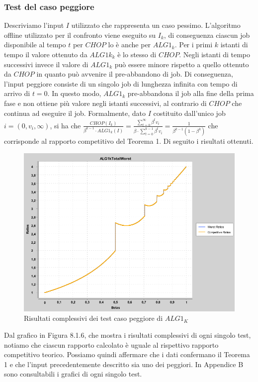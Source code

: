 \documentclass[12pt]{article}
\begin{document}
\subsubsection{Test del caso peggiore}
Descriviamo l'input $I$ utilizzato che rappresenta un caso pessimo. L'algoritmo offline utilizzato per il confronto viene eseguito su $I_{k}$, di conseguenza ciascun job disponibile al tempo $t$ per $CHOP$ lo è anche per $ALG1_{k}$. Per i primi $k$ istanti di tempo il valore ottenuto da $ALG1k_{k}$ è lo stesso di $CHOP$. Negli istanti di tempo successivi invece il valore di $ALG1_{k}$ può essere minore rispetto a quello ottenuto da $CHOP$ in quanto può avvenire il pre-abbandono di job. Di conseguenza, l'input peggiore consiste di un singolo job di lunghezza infinita con tempo di arrivo di $t = 0$. In questo modo, $ALG1_{k}$ pre-abbandona il job alla fine della prima fase e non ottiene più valore negli istanti successivi, al contrario di $CHOP$ che continua ad eseguire il job. Formalmente, dato $I$ costituito dall'unico job  $i = (0, v_{i},\infty)$, si ha che $\frac{CHOP(I_{k})}{\beta^{k-1} \cdot ALG1_{k}(I)} = \frac{\sum_{t = 0}^{\infty}\beta^{t}v_{i}}{\beta \cdot \sum_{t = 0}^{k-1}\beta^{t} v_{i}} = \frac{1}{\beta^{k-1}(1 - \beta^{k})}$ che corrisponde al rapporto competitivo del Teorema 1. Di seguito i risultati ottenuti.
\begin{figure}[H]
\caption{Risultati complessivi dei test caso peggiore di $ALG1_{K}$}
\centering
\includegraphics[scale=0.4]{worst/ALG1kTotalWorst.png}
\end{figure}
Dal grafico in Figura 8.1.6, che mostra i risultati complessivi di ogni singolo test, notiamo che ciascun rapporto calcolato è uguale al rispettivo rapporto competitivo teorico. Possiamo quindi affermare che i dati confermano il Teorema 1 e che l'input precedentemente descritto sia uno dei peggiori. In Appendice B sono consultabili i grafici di ogni singolo test.
\end{document}
